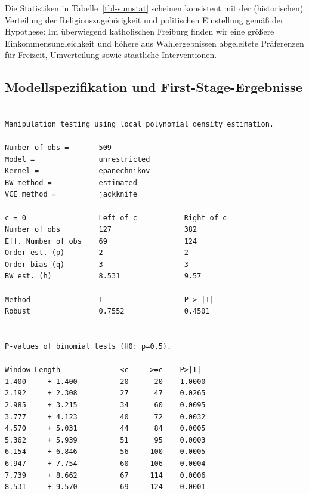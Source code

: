 \documentclass[
  a4paper,
  DIV=11,
  oneside]{scrreprt}
\newenvironment{Shaded}{\begin{snugshade}}{\end{snugshade}}
\newcommand{\AttributeTok}[1]{\textcolor[rgb]{0.40,0.45,0.13}{#1}}
\newcommand{\DecValTok}[1]{\textcolor[rgb]{0.68,0.00,0.00}{#1}}
\newcommand{\FunctionTok}[1]{\textcolor[rgb]{0.28,0.35,0.67}{#1}}
\newcommand{\NormalTok}[1]{\textcolor[rgb]{0.00,0.23,0.31}{#1}}
\newcommand{\OtherTok}[1]{\textcolor[rgb]{0.00,0.23,0.31}{#1}}
\newcommand{\SpecialCharTok}[1]{\textcolor[rgb]{0.37,0.37,0.37}{#1}}
\newcommand{\StringTok}[1]{\textcolor[rgb]{0.13,0.47,0.30}{#1}}
\begin{document}
Die Statistiken in Tabelle~\ref{tbl-sumstat} scheinen konsistent mit der
(historischen) Verteilung der Religionszugehörigkeit und politischen
Einstellung gemäß der Hypothese: Im überwiegend katholischen Freiburg
finden wir eine größere Einkommensungleichkeit und höhere aus
Wahlergebnissen abgeleitete Präferenzen für Freizeit, Umverteilung sowie
staatliche Interventionen.

\subsection{Modellspezifikation und
First-Stage-Ergebnisse}\label{modellspezifikation-und-first-stage-ergebnisse}

\begin{Shaded}
\end{Shaded}

\begin{verbatim}

Manipulation testing using local polynomial density estimation.

Number of obs =       509
Model =               unrestricted
Kernel =              epanechnikov
BW method =           estimated
VCE method =          jackknife

c = 0                 Left of c           Right of c          
Number of obs         127                 382                 
Eff. Number of obs    69                  124                 
Order est. (p)        2                   2                   
Order bias (q)        3                   3                   
BW est. (h)           8.531               9.57                

Method                T                   P > |T|             
Robust                0.7552              0.4501              


P-values of binomial tests (H0: p=0.5).

Window Length              <c     >=c    P>|T|
1.400     + 1.400          20      20    1.0000
2.192     + 2.308          27      47    0.0265
2.985     + 3.215          34      60    0.0095
3.777     + 4.123          40      72    0.0032
4.570     + 5.031          44      84    0.0005
5.362     + 5.939          51      95    0.0003
6.154     + 6.846          56     100    0.0005
6.947     + 7.754          60     106    0.0004
7.739     + 8.662          67     114    0.0006
8.531     + 9.570          69     124    0.0001
\end{verbatim}
\end{document}
